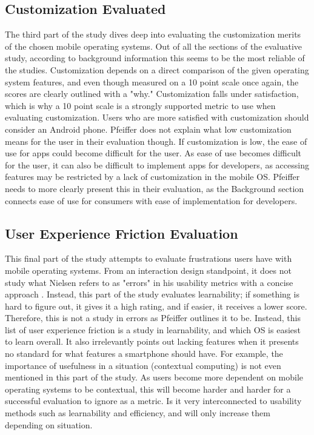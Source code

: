 \documentclass[11pt]{article}
\begin{document}
\subsection{Customization Evaluated}
The third part of the study dives deep into evaluating the customization merits of the chosen mobile operating systems. Out of all the sections of the evaluative study, according to background information this seems to be the most reliable of the studies. Customization depends on a direct comparison of the given operating system features, and even though measured on a 10 point scale once again, the scores are clearly outlined with a "why." Customization falls under satisfaction, which is why a 10 point scale is a strongly supported metric to use when evaluating customization. Users who are more satisfied with customization should consider an Android phone. Pfeiffer does not explain what low customization means for the user in their evaluation though. If customization is low, the ease of use for apps could become difficult for the user. As ease of use becomes difficult for the user, it can also be difficult to implement apps for developers, as accessing features may be restricted by a lack of customization in the mobile OS. Pfeiffer needs to more clearly present this in their evaluation, as the Background section connects ease of use for consumers with ease of implementation for developers.
\subsection{User Experience Friction Evaluation}
This final part of the study attempts to evaluate frustrations users have with mobile operating systems. From an interaction design standpoint, it does not study what Nielsen refers to as "errors" in his usability metrics with a concise approach \cite{Nielsen}. Instead, this part of the study evaluates learnability; if something is hard to figure out, it gives it a high rating, and if easier, it receives a lower score. Therefore, this is not a study in errors as Pfeiffer outlines it to be. Instead, this list of user experience friction is a study in learnability, and which OS is easiest to learn overall. It also irrelevantly points out lacking features when it presents no standard for what features a smartphone should have. For example, the importance of usefulness in a situation (contextual computing) is not even mentioned in this part of the study. As users become more dependent on mobile operating systems to be contextual, this will become harder and harder for a successful evaluation to ignore as a metric. Is it very interconnected to usability methods such as learnability and efficiency, and will only increase them depending on situation.
\end{document}
